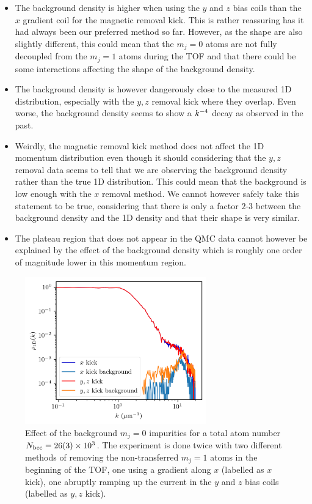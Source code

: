 \begin{itemize}
    \item The background density is higher when using the $y$ and $z$ bias coils than the $x$ gradient coil for the magnetic removal kick. This is rather reassuring has it had always been our preferred method so far. However, as the shape are also slightly different, this could mean that the $m_j=0$ atoms are not fully decoupled from the $m_j=1$ atoms during the TOF and that there could be some interactions affecting the shape of the background density. 
    \item The background density is however dangerously close to the measured 1D distribution, especially with the $y,z$ removal kick where they overlap. Even worse, the background density seems to show a $k^{-4}$ decay as observed in the past.
    \item Weirdly, the magnetic removal kick method does not affect the 1D momentum distribution even though it should considering that the $y,z$ removal data seems to tell that we are observing the background density rather than the true 1D distribution. This could mean that the background is low enough with the $x$ removal method. We cannot however safely take this statement to be true, considering that there is only a factor $2$-$3$ between the background density and the 1D density and that their shape is very similar.
    \item The plateau region that does not appear in the QMC data cannot however be explained by the effect of the background density which is roughly one order of magnitude lower in this momentum region.
\end{itemize}

\begin{figure}
    \centering
    \includegraphics[width=0.7\textwidth]{Fig/Chapter5/1D_background_low.png}
    \caption[Effect of the background $m_j=0$ impurities for a total atom number $\NBEC=26(3) \times 10^3$]{Effect of the background $m_j=0$ impurities for a total atom number $\NBEC=26(3) \times 10^3$. The experiment is done twice with two different methods of removing the non-transferred $m_j=1$ atoms in the beginning of the TOF, one using a gradient along $x$ (labelled as $x$ kick), one abruptly ramping up the current in the $y$ and $z$ bias coils (labelled as $y,z$ kick).}
    \label{fig:background_low_N}
\end{figure}

